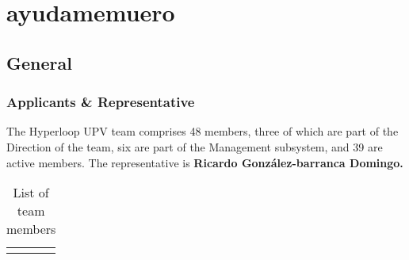 \chapter*{ayudamemuero}

\section{General}

\subsection{Applicants \& Representative}

The Hyperloop UPV team comprises 48 members, three of which are part of the Direction of the team, six are part of the Management subsystem, and 39 are active members. The representative is \textbf{Ricardo González-barranca Domingo.} 

\begin{table}[H]
\begin{tabular}{c}
\centering

\includegraphics
    [width = 1\textwidth]
    {FIGURES/Tabla de miembros.png}
\end{tabular}
\caption{List of team members}
\end{table}